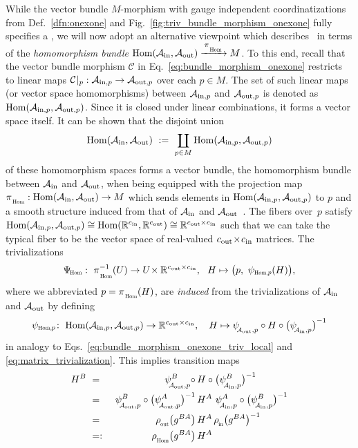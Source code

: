 While the vector bundle $M$-morphism with gauge independent coordinatizations from Def.~\ref{dfn:onexone} and Fig.~\ref{fig:triv_bundle_morphism_onexone} fully specifies a \onexoneGM, we will now adopt an alternative viewpoint which describes \onexoneGMs\ in terms of the \emph{homomorphism bundle} $\Hom(\Ain,\Aout) \xrightarrow{\,\piHom\,} M$.
To this end, recall that the vector bundle morphism $\mathcal{C}$ in Eq.~\eqref{eq:bundle_morphism_onexone} restricts to linear maps ${\mathcal{C}\!\:|_p}: \mathcal{A}_{\textup{in},p}\to\mathcal{A}_{\textup{out},p}$ over each $p\in M$.
The set of such linear maps (or vector space homomorphisms) between $\mathcal{A}_{\textup{in},p}$ and $\mathcal{A}_{\textup{out},p}$ is denoted as $\operatorname{Hom}(\mathcal{A}_{\textup{in},p},\mathcal{A}_{\textup{out},p})$.
Since it is closed under linear combinations, it forms a vector space itself.
It can be shown that the disjoint union
\begin{align}
    \operatorname{Hom}(\mathcal{A}_\textup{in},\mathcal{A}_\textup{out})\ :=\ \coprod_{p\in M} \operatorname{Hom}(\mathcal{A}_{\textup{in},p},\mathcal{A}_{\textup{out},p})
\end{align}
of these homomorphism spaces forms a vector bundle, the homomorphism bundle between $\mathcal{A}_\textup{in}$ and $\mathcal{A}_\textup{out}$, when being equipped with the projection map $\piHom: \Hom(\Ain,\Aout) \to M$ which sends elements in $\operatorname{Hom}(\mathcal{A}_{\textup{in},p},\mathcal{A}_{\textup{out},p})$ to $p$ and a smooth structure induced from that of $\mathcal{A}_\textup{in}$ and $\mathcal{A}_\textup{out}$~\cite{dundas2018differentialTopology}.
The fibers over~$p$ satisfy $\operatorname{Hom}(\mathcal{A}_{\textup{in},p},\mathcal{A}_{\textup{out},p}) \cong \operatorname{Hom}(\mathbb{R}^{c_\textup{in}},\mathbb{R}^{c_\textup{out}}) \cong \mathbb{R}^{{c_\textup{out}}\times{c_\textup{in}}}$ such that we can take the typical fiber to be the vector space of real-valued ${{c_\textup{out}}\!\times\!{c_\textup{in}}}$ matrices.
The trivializations
\begin{align}
    \PsiHom:\ \piHom^{-1}(U) \to U\!\times\R^{\cout\times\cin},\ \ H\mapsto \big(p,\ \psiHomp(H)\big) ,
\end{align}
where we abbreviated $p=\piHom(H)$, are \emph{induced} from the trivializations of $\mathcal{A}_\textup{in}$ and $\mathcal{A}_\textup{out}$ by defining
\begin{align}\label{eq:Hom_bdl_triv_ptwise}
    \psiHomp\!:\ \Hom(\Ainp,\Aoutp) \to \R^{\cout\times\cin} ,\ \ \ H\mapsto \psiAoutp \circ H \circ \big(\psiAinp\big)^{-1}
\end{align}
in analogy to Eqs.~\eqref{eq:bundle_morphism_onexone_triv_local} and \eqref{eq:matrix_trivialization}.
This implies transition maps
\begin{alignat}{3}
    H^B
    \ &=&\ \psiAoutp^B \circ\,&H \circ \big(\psiAinp^B\big)^{-1} \notag \\
    \ &=&\ \psiAoutp^B \circ \big(\psiAoutp^A\big)^{-1}\,&H^A\ \psiAinp^A \circ \big(\psiAinp^B\big)^{-1} \notag \\
    \ &=&\ \rhoout\big(g^{BA}\big)\, &H^A\, \rhoin\big(g^{BA}\big)^{-1} \notag \\
    \ &=:&\ \rhoHom\big(g^{BA}\big)\, &H^A
\end{alignat}

